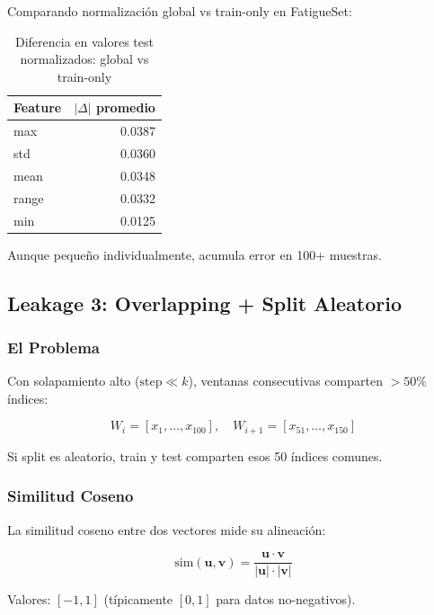 \documentclass[11pt,twoside,a4paper]{article}
\begin{document}
Comparando normalización global vs train-only en FatigueSet:

\begin{table}[H]
\centering
\caption{Diferencia en valores test normalizados: global vs train-only}
\label{tab:leakage_norm}
\begin{tabular}{|l|r|}
\hline
Feature & $|\Delta|$ promedio \\
\hline
max & 0.0387 \\
\hline
std & 0.0360 \\
\hline
mean & 0.0348 \\
\hline
range & 0.0332 \\
\hline
min & 0.0125 \\
\hline
\end{tabular}
\end{table}

Aunque pequeño individualmente, acumula error en 100+ muestras.

\subsection{Leakage 3: Overlapping + Split Aleatorio}

\subsubsection{El Problema}

Con solapamiento alto ($\text{step} \ll k$), ventanas consecutivas comparten $> 50\%$ índices:

\begin{equation}
W_i = [x_1, \ldots, x_{100}], \quad W_{i+1} = [x_{51}, \ldots, x_{150}]
\end{equation}

Si split es aleatorio, train y test comparten esos 50 índices comunes.

\subsubsection{Similitud Coseno}

La similitud coseno entre dos vectores mide su alineación:

\begin{equation}
\text{sim}(\mathbf{u}, \mathbf{v}) = \frac{\mathbf{u} \cdot \mathbf{v}}{|\mathbf{u}| \cdot |\mathbf{v}|}
\end{equation}

Valores: $[-1, 1]$ (típicamente $[0, 1]$ para datos no-negativos).
\end{document}
